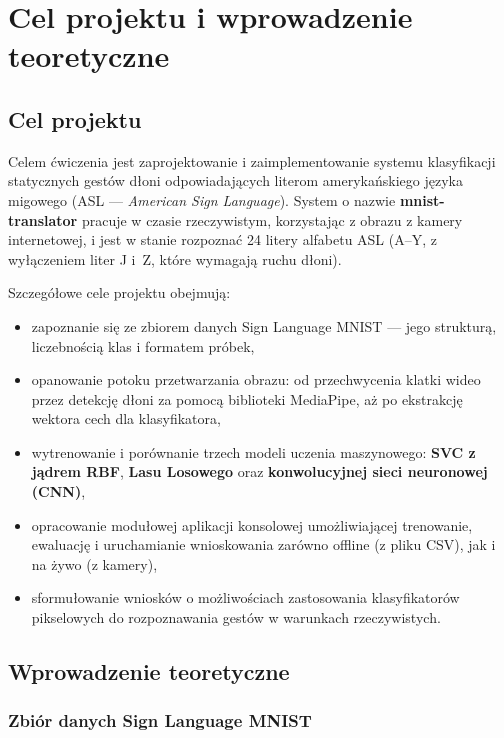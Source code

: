 \chapter{Cel projektu i wprowadzenie teoretyczne}
\label{cha:chapter001}

\section{Cel projektu}

Celem ćwiczenia jest zaprojektowanie i zaimplementowanie systemu klasyfikacji
statycznych gestów dłoni odpowiadających literom amerykańskiego języka migowego
(ASL --- \textit{American Sign Language}). System o nazwie \textbf{mnist-translator}
pracuje w czasie rzeczywistym, korzystając z obrazu z kamery internetowej,
i jest w stanie rozpoznać 24 litery alfabetu ASL (A--Y, z wyłączeniem liter J
i~Z, które wymagają ruchu dłoni).

Szczegółowe cele projektu obejmują:

\begin{itemize}
    \item zapoznanie się ze zbiorem danych Sign Language MNIST --- jego strukturą,
          liczebnością klas i formatem próbek,
    \item opanowanie potoku przetwarzania obrazu: od przechwycenia klatki wideo
          przez detekcję dłoni za pomocą biblioteki MediaPipe, aż po ekstrakcję
          wektora cech dla klasyfikatora,
    \item wytrenowanie i porównanie trzech modeli uczenia maszynowego:
          \textbf{SVC z jądrem RBF}, \textbf{Lasu Losowego} oraz
          \textbf{konwolucyjnej sieci neuronowej (CNN)},
    \item opracowanie modułowej aplikacji konsolowej umożliwiającej trenowanie,
          ewaluację i uruchamianie wnioskowania zarówno offline (z pliku CSV),
          jak i na żywo (z kamery),
    \item sformułowanie wniosków o możliwościach zastosowania klasyfikatorów
          pikselowych do rozpoznawania gestów w warunkach rzeczywistych.
\end{itemize}

\section{Wprowadzenie teoretyczne}

\subsection{Zbiór danych Sign Language MNIST}

